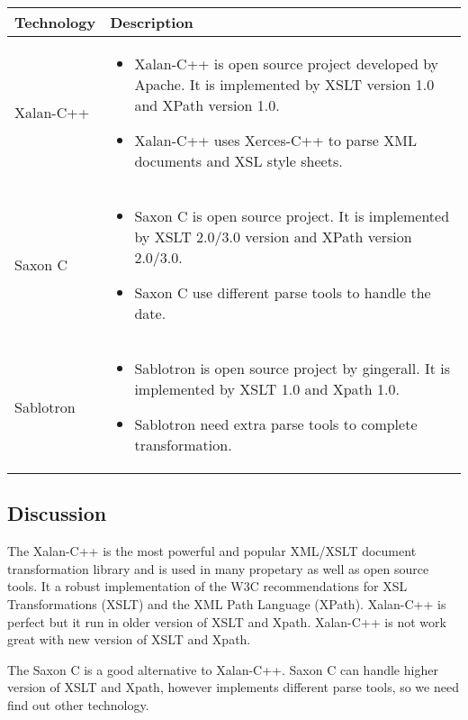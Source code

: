\begin{center}
    \begin{tabular}{ | l | p{10cm} |}
    \hline
    Technology & Description  \\ \hline
    Xalan-C++ \cite{xalan} &
    \begin{itemize}
      \item Xalan-C++ is open source project developed by Apache. It is implemented by XSLT version 1.0 and XPath version 1.0.
      \item Xalan-C++ uses Xerces-C++ to parse XML documents and XSL style sheets.
    \end{itemize}\\ \hline
    Saxon C \cite{Saxon_c} &
    \begin{itemize}
      \item Saxon C is open source project. It is implemented by XSLT 2.0/3.0 version and XPath version 2.0/3.0.
      \item Saxon C use different parse tools to handle the date.
    \end{itemize}\\ \hline
    Sablotron \cite{Sablotron_intro} &
    \begin{itemize}
      \item Sablotron is open source project by gingerall. It is implemented by XSLT 1.0 and Xpath 1.0.
	  \item Sablotron need extra parse tools to complete transformation.
    \end{itemize}\\ \hline
    \end{tabular}
\end{center}

\subsection{Discussion}

The Xalan-C++ is the most powerful and popular XML/XSLT document transformation library and is used in many propetary as well as open source tools.
It a robust implementation of the W3C recommendations for XSL Transformations (XSLT) and the XML Path Language (XPath).
Xalan-C++ is perfect but it run in older version of XSLT and Xpath.
Xalan-C++ is not work great with new version of XSLT and Xpath.

The Saxon C is a good alternative to Xalan-C++.
Saxon C can handle higher version of XSLT and Xpath, however implements different parse tools, so we need find out other technology.

